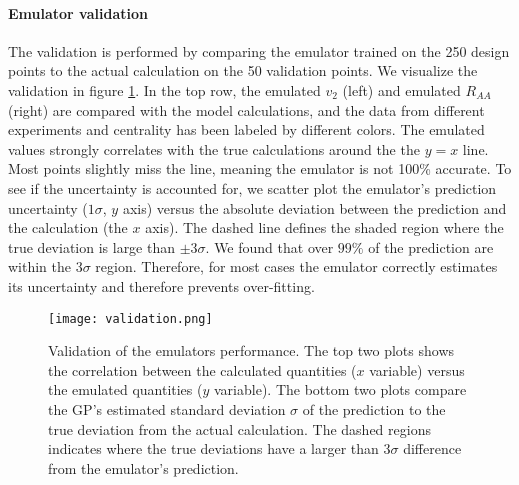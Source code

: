 \paragraph{Emulator validation} 
The validation is performed by comparing the emulator trained on the 250 design points to the actual calculation on the 50 validation points.
We visualize the validation in figure \ref{fig:new:validation}.
In the top row, the emulated $v_2$ (left) and emulated $R_{AA}$ (right) are compared with the model calculations, and the data from different experiments and centrality has been labeled by different colors.
The emulated values strongly correlates with the true calculations around the the $y=x$ line.
Most points slightly miss the line, meaning the emulator is not 100\% accurate.
To see if the uncertainty is accounted for, we scatter plot the emulator's prediction uncertainty ($1\sigma$, $y$ axis) versus the absolute deviation between the prediction and the calculation (the $x$ axis).
The dashed line defines the shaded region where the true deviation is large than $\pm 3\sigma$.
We found that over $99\%$ of the prediction are within the $3\sigma$ region.
Therefore, for most cases the emulator correctly estimates its uncertainty  and therefore prevents over-fitting.

\begin{figure}
\singlespacing
\centering
\texttt{[image: validation.png]}
\caption[Validation of the emulators performance. The top two plots shows]{Validation of the emulators performance. The top two plots shows the correlation between the calculated quantities ($x$ variable) versus the emulated quantities ($y$ variable). The bottom two plots compare the GP's estimated standard deviation $\sigma$ of the prediction to the true deviation from the actual calculation. The dashed regions indicates where the true deviations have a larger than $3\sigma$ difference from the emulator's prediction.}
\label{fig:new:validation}
\end{figure}


